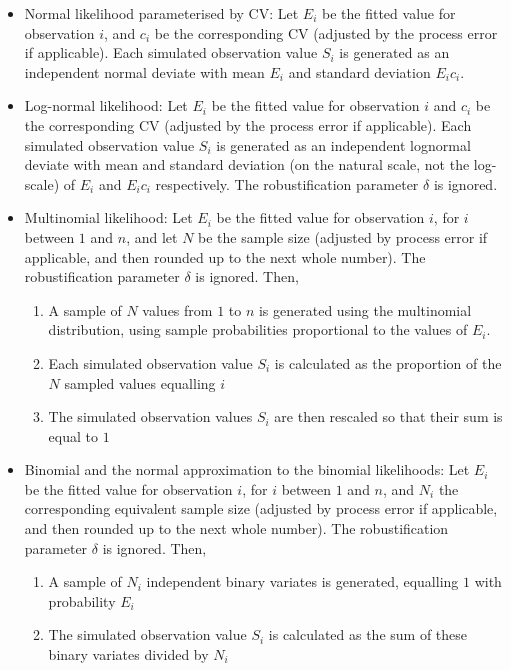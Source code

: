 \begin{itemize}
  \item{} Normal likelihood parameterised by CV: Let $E_{i}$ be the fitted value for observation $i$, and $c_i$ be the corresponding CV (adjusted by the process error if applicable). Each simulated observation value $S_i$ is generated as an independent normal deviate with mean $E_i$ and standard deviation $E_i c_i$.
  \item{} Log-normal likelihood: Let $E_i$ be the fitted value for observation $i$ and $c_i$ be the corresponding CV (adjusted by the process error if applicable). Each simulated observation value $S_i$ is generated as an independent lognormal deviate with mean and standard deviation (on the natural scale, not the log-scale) of $E_i$ and $E_i c_i$ respectively. The robustification parameter $\delta$ is ignored.
  \item{} Multinomial likelihood: Let $E_i$ be the fitted value for observation $i$, for $i$ between $1$ and $n$, and let $N$ be the sample size (adjusted by process error if applicable, and then rounded up to the next whole number). The robustification parameter $\delta$ is ignored. Then,
  \begin{enumerate}
    \item{} A sample of $N$ values from $1$ to $n$ is generated using the multinomial distribution, using sample probabilities proportional to the values of $E_i$.
    \item{} Each simulated observation value $S_i$ is calculated as the proportion of the $N$ sampled values equalling $i$
    \item{} The simulated observation values $S_i$ are then rescaled so that their sum is equal to $1$
  \end{enumerate}
  \item{} Binomial and the normal approximation to the binomial likelihoods: Let $E_i$ be the fitted value for observation $i$, for $i$ between $1$ and $n$, and $N_i$ the corresponding equivalent sample size (adjusted by process error if applicable, and then rounded up to the next whole number). The robustification parameter $\delta$ is ignored. Then,
  \begin{enumerate}
    \item{} A sample of $N_i$ independent binary variates is generated, equalling $1$ with probability $E_i$
    \item{}	The simulated observation value $S_i$ is calculated as the sum of these binary variates divided by $N_i$
  \end{enumerate}
\end{itemize}

